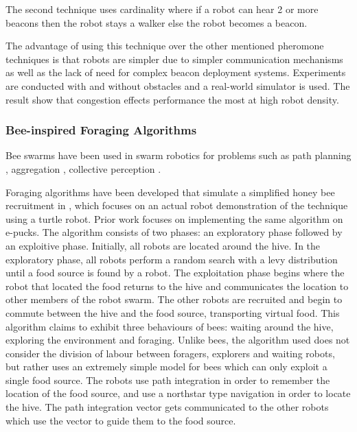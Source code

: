 The second technique uses cardinality where if a robot can hear 2 or more beacons then the robot stays a walker else the robot becomes a beacon. 

The advantage of using this technique over the other mentioned pheromone techniques is that robots are simpler due to simpler communication mechanisms as well as the lack of need for complex beacon deployment systems. Experiments are conducted with and without obstacles and a real-world simulator is used. The result show that congestion effects performance the most at high robot density. %

\subsubsection{Bee-inspired Foraging Algorithms}
Bee swarms have been used in swarm robotics for problems such as path planning \cite{lin2009chaotic}, aggregation \cite{kernbach2009re}, collective perception \cite{schmickl2007collective}.%

Foraging algorithms have been developed that simulate a simplified honey bee recruitment in \cite{alers2014biologically}, which focuses on an actual robot demonstration of the technique using a turtle robot. Prior work focuses on implementing the same algorithm on e-pucks. The algorithm consists of two phases: an exploratory phase followed by an exploitive phase. Initially, all robots are located around the hive. In the exploratory phase, all robots perform a random search with a levy distribution until a food source is found by a robot. The exploitation phase begins where the robot that located the food returns to the hive and communicates the location to other members of the robot swarm. The other robots are recruited and begin to commute between the hive and the food source, transporting virtual food. This algorithm claims to exhibit three behaviours of bees: waiting around the hive, exploring the environment and foraging. Unlike bees, the algorithm used does not consider the division of labour between foragers, explorers and waiting robots, but rather uses an extremely simple model for bees which can only exploit a single food source. The robots use path integration in order to remember the location of the food source, and use a northstar type navigation in order to locate the hive. The path integration vector gets communicated to the other robots which use the vector to guide them to the food source. 

